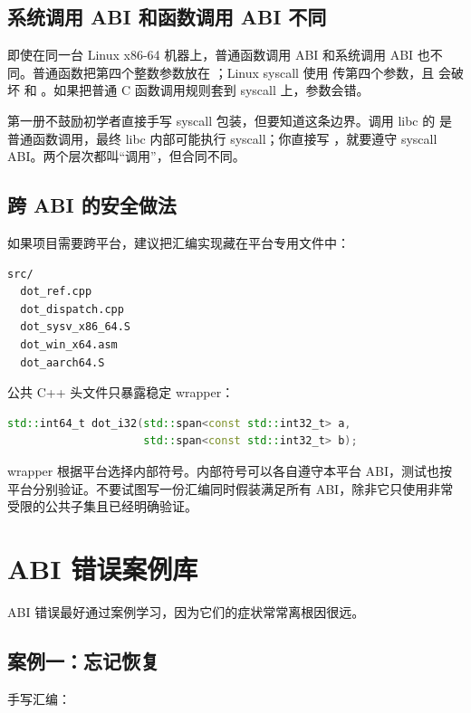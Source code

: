 \subsection{系统调用 ABI 和函数调用 ABI 不同}

即使在同一台 Linux x86-64 机器上，普通函数调用 ABI 和系统调用 ABI 也不同。普通函数把第四个整数参数放在 ；Linux syscall 使用  传第四个参数，且  会破坏  和 。如果把普通 C 函数调用规则套到 syscall 上，参数会错。

第一册不鼓励初学者直接手写 syscall 包装，但要知道这条边界。调用 libc 的  是普通函数调用，最终 libc 内部可能执行 syscall；你直接写 ，就要遵守 syscall ABI。两个层次都叫“调用”，但合同不同。

\subsection{跨 ABI 的安全做法}

如果项目需要跨平台，建议把汇编实现藏在平台专用文件中：

\begin{lstlisting}
src/
  dot_ref.cpp
  dot_dispatch.cpp
  dot_sysv_x86_64.S
  dot_win_x64.asm
  dot_aarch64.S
\end{lstlisting}

公共 C++ 头文件只暴露稳定 wrapper：

\begin{lstlisting}[language=C++]
std::int64_t dot_i32(std::span<const std::int32_t> a,
                     std::span<const std::int32_t> b);
\end{lstlisting}

wrapper 根据平台选择内部符号。内部符号可以各自遵守本平台 ABI，测试也按平台分别验证。不要试图写一份汇编同时假装满足所有 ABI，除非它只使用非常受限的公共子集且已经明确验证。

\section{ABI 错误案例库}

ABI 错误最好通过案例学习，因为它们的症状常常离根因很远。

\subsection{案例一：忘记恢复 }

手写汇编：

